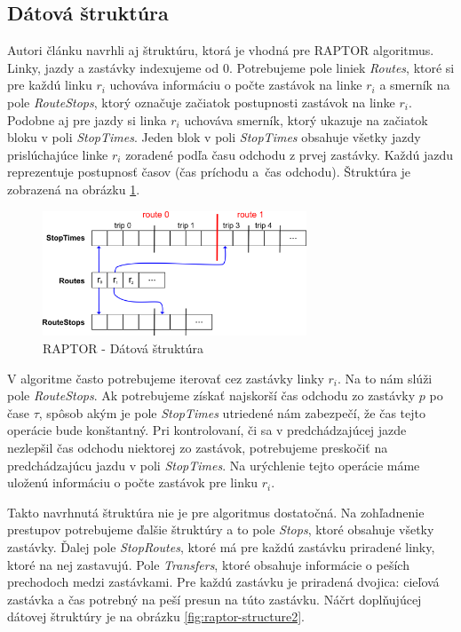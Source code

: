 \subsection{Dátová štruktúra}
\label{subsec:structure}
Autori článku navrhli aj štruktúru, ktorá je vhodná pre RAPTOR algoritmus. Linky, jazdy a zastávky indexujeme od $0$. Potrebujeme pole liniek \textit{Routes}, ktoré si pre každú linku $r_i$ uchováva informáciu o počte zastávok na linke $r_i$ a smerník na pole \textit{RouteStops}, ktorý označuje začiatok postupnosti zastávok na linke $r_i$. Podobne aj pre jazdy si linka $r_i$ uchováva smerník, ktorý ukazuje na začiatok bloku v poli \textit{StopTimes}. Jeden blok v poli \textit{StopTimes} obsahuje všetky jazdy prislúchajúce linke $r_i$ zoradené podľa času odchodu z prvej zastávky. Každú jazdu reprezentuje postupnosť časov (čas príchodu a~čas odchodu). Štruktúra je zobrazená na obrázku \ref{fig:raptor-structure}. 

\begin{figure}[H]
\centerline{\includegraphics[width=0.7\textwidth]{images/raptor-structure}}
\caption[RAPTOR - Dátová štruktúra]{RAPTOR - Dátová štruktúra}
\label{fig:raptor-structure}
\end{figure}

V algoritme často potrebujeme iterovať cez zastávky linky $r_i$. Na to nám slúži pole \textit{RouteStops}. Ak potrebujeme získať najskorší čas odchodu zo zastávky $p$ po čase $\tau$, spôsob akým je pole \textit{StopTimes} utriedené nám zabezpečí, že čas tejto operácie bude konštantný.
Pri kontrolovaní, či sa v predchádzajúcej jazde nezlepšil čas odchodu niektorej zo zastávok, potrebujeme preskočiť na predchádzajúcu jazdu v poli \textit{StopTimes}. Na urýchlenie tejto operácie máme uloženú informáciu o počte zastávok pre linku $r_i$.

Takto navrhnutá štruktúra nie je pre algoritmus dostatočná. Na zohľadnenie prestupov potrebujeme ďalšie štruktúry a to pole \textit{Stops}, ktoré obsahuje všetky zastávky. Ďalej pole \textit{StopRoutes}, ktoré má pre každú zastávku priradené linky, ktoré na nej zastavujú. Pole \textit{Transfers}, ktoré obsahuje informácie o peších prechodoch medzi zastávkami. Pre každú zastávku je priradená dvojica: cieľová zastávka a čas potrebný na peší presun na túto zastávku. Náčrt doplňujúcej dátovej štruktúry je na obrázku \ref{fig:raptor-structure2}.

